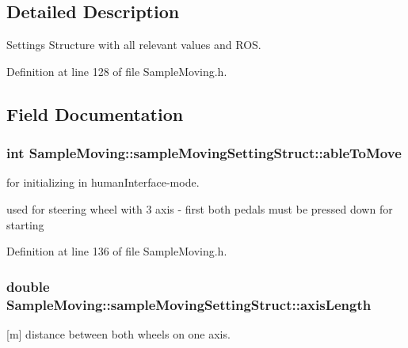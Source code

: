 \subsection{Detailed Description}
Settings Structure with all relevant values and R\-O\-S. 

Definition at line 128 of file Sample\-Moving.\-h.



\subsection{Field Documentation}
\hypertarget{structSampleMoving_1_1sampleMovingSettingStruct_a14089eeff8e96683e056b50c6ae6a998}{
\subsubsection[{able\-To\-Move}]{\setlength{\rightskip}{0pt plus 5cm}int Sample\-Moving\-::sample\-Moving\-Setting\-Struct\-::able\-To\-Move}}\label{structSampleMoving_1_1sampleMovingSettingStruct_a14089eeff8e96683e056b50c6ae6a998}


for initializing in human\-Interface-\/mode. 

used for steering wheel with 3 axis -\/ first both pedals must be pressed down for starting 

Definition at line 136 of file Sample\-Moving.\-h.

\hypertarget{structSampleMoving_1_1sampleMovingSettingStruct_a72168d31106a7f5e12c2eb303a487515}{
\subsubsection[{axis\-Length}]{\setlength{\rightskip}{0pt plus 5cm}double Sample\-Moving\-::sample\-Moving\-Setting\-Struct\-::axis\-Length}}\label{structSampleMoving_1_1sampleMovingSettingStruct_a72168d31106a7f5e12c2eb303a487515}


\mbox{[}m\mbox{]} distance between both wheels on one axis. 

